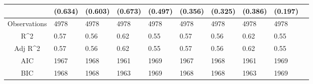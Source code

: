 \documentclass{article}
\begin{document}
\begin{table}[H]
\begin{tabular}{|clllllllll|}
   & (0.634) & (0.603) & (0.673) & (0.497) & (0.356) & (0.325) & (0.386) & (0.197) & \\ 
  \hline 
 Observations & 4978 & 4978 & 4978 & 4978 & 4978 & 4978 & 4978 & 4978 & \\ 
  R^2 & 0.57 & 0.56 & 0.62 & 0.55 & 0.57 & 0.56 & 0.62 & 0.55 & \\ 
  Adj R^2 & 0.57 & 0.56 & 0.62 & 0.55 & 0.57 & 0.56 & 0.62 & 0.55 & \\ 
  AIC & 1967 & 1968 & 1961 & 1969 & 1967 & 1968 & 1961 & 1969 & \\ 
  BIC & 1968 & 1968 & 1963 & 1969 & 1968 & 1968 & 1963 & 1969 & \\ 
   \hline
\end{tabular}
 
\end{table}
\end{document}
